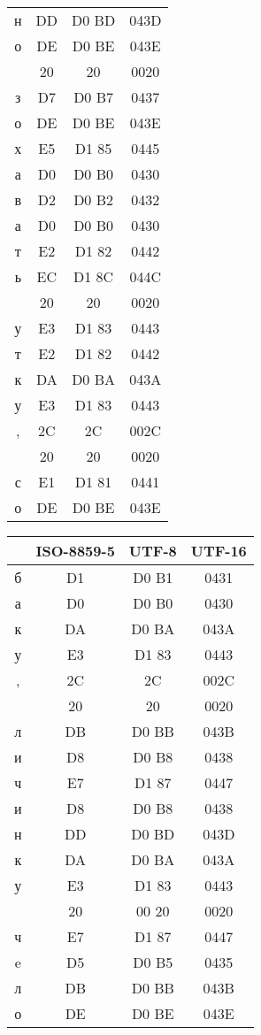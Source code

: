 \begin{center}
\begin{tabular}{|c|c|c|c|}
н & DD & D0 BD & 043D\\
о & DE & D0 BE & 043E\\
  & 20 & 20 & 0020\\
з & D7 & D0 B7 & 0437\\
о & DE & D0 BE & 043E\\
х & E5 & D1 85 & 0445\\
а & D0 & D0 B0 & 0430\\
в & D2 & D0 B2 & 0432\\
а & D0 & D0 B0 & 0430\\
т & E2 & D1 82 & 0442\\
ь & EC & D1 8C & 044C\\
  & 20 & 20 & 0020\\
у & E3 & D1 83 & 0443\\
т & E2 & D1 82 & 0442\\
к & DA & D0 BA & 043A\\
у & E3 & D1 83 & 0443\\
, & 2C &    2C & 002C\\
  & 20 & 20 & 0020\\
с & E1 & D1 81 & 0441\\
о & DE & D0 BE & 043E\\
\hline
\end{tabular}
\quad
\begin{tabular}{|c|c|c|c|}
\hline
 & ISO-8859-5 & UTF-8 & UTF-16\\
\hline
б & D1 & D0 B1 & 0431\\
а & D0 & D0 B0 & 0430\\
к & DA & D0 BA & 043A\\
у & E3 & D1 83 & 0443\\
, & 2C &    2C & 002C\\
  & 20 & 20 & 0020\\
л & DB & D0 BB & 043B\\
и & D8 & D0 B8 & 0438\\
ч & E7 & D1 87 & 0447\\
и & D8 & D0 B8 & 0438\\
н & DD & D0 BD & 043D\\
к & DA & D0 BA & 043A\\
у & E3 & D1 83 & 0443\\
  & 20 & 00 20 & 0020\\
ч & E7 & D1 87 & 0447\\
e & D5 & D0 B5 & 0435\\
л & DB & D0 BB & 043B\\
о & DE & D0 BE & 043E\\

\end{tabular}
\end{center}
